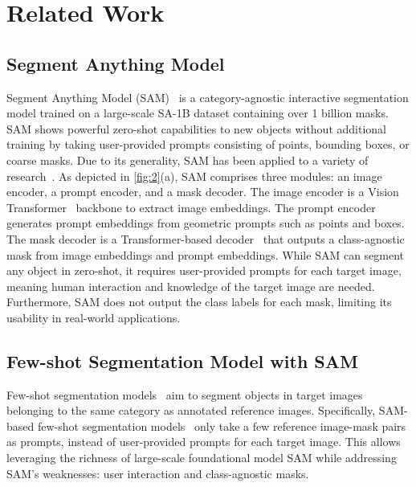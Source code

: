 \section{Related Work}
\subsection{Segment Anything Model}
Segment Anything Model (SAM)~\cite{SAM} is a category-agnostic interactive segmentation model trained on a large-scale SA-1B dataset containing over 1 billion masks. SAM shows powerful zero-shot capabilities to new objects without additional training by taking user-provided prompts consisting of points, bounding boxes, or coarse masks. Due to its generality, SAM has been applied to a variety of research~\cite{HQSAM, MedSAM, FastSAM, Semantic-sam, Grounded-sam, Depth-anything, Samrs, survey-sam}. As depicted in \cref{fig:2}(a), SAM comprises three modules: an image encoder, a prompt encoder, and a mask decoder. The image encoder is a Vision Transformer~\cite{ViT} backbone to extract image embeddings. The prompt encoder generates prompt embeddings from geometric prompts such as points and boxes. The mask decoder is a Transformer-based decoder~\cite{Transformer} that outputs a class-agnostic mask from image embeddings and prompt embeddings. While SAM can segment any object in zero-shot, it requires user-provided prompts for each target image, meaning human interaction and knowledge of the target image are needed. Furthermore, SAM does not output the class labels for each mask, limiting its usability in real-world applications.

\subsection{Few-shot Segmentation Model with SAM}
Few-shot segmentation models~\cite{Panet, PGMA-Net, Seggpt, BAM, RefLDM, Segic, PI-CLIP, SINE, survey-few} aim to segment objects in target images belonging to the same category as annotated reference images. Specifically, SAM-based few-shot segmentation models~\cite{PerSAM, VRP-SAM, Mather, APSeg, SAMIC, Alignsam, PDM, NubbleDrop, PMC, Foreground-Covering} only take a few reference image-mask pairs as prompts, instead of user-provided prompts for each target image. This allows leveraging the richness of large-scale foundational model SAM while addressing SAM's weaknesses: user interaction and class-agnostic masks.

